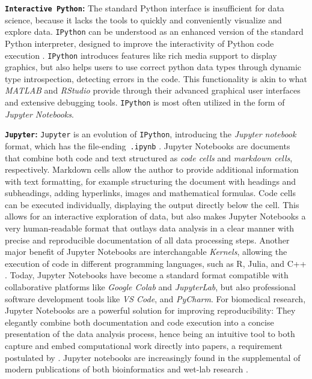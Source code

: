 \textbf{\texttt{\textbf Interactive Python}:} The standard Python interface is
insufficient for data science, because it lacks the tools to quickly and
conveniently visualize and explore data. \texttt{IPython} can be understood as
an enhanced version of the standard Python interpreter, designed to improve the
interactivity of Python code execution \cite{perezIPythonSystemInteractive2007}.
\texttt{IPython} introduces features like rich media support to display
graphics, but also helps users to use correct python data types through dynamic
type introspection, detecting errors in the code. This functionality is akin to
what \textit{MATLAB} and \textit{RStudio} provide through their advanced
graphical user interfaces and extensive debugging tools. \texttt{IPython} is most
often utilized in the form of \emph{Jupyter Notebooks}.



\textbf{\texttt{Jupyter}:} \texttt{Jupyter} is an evolution of \texttt{IPython},
introducing the \emph{Jupyter notebook} format, which has the
file-ending~\texttt{.ipynb} \cite{kluyverJupyterNotebooksPublishing2016}.
Jupyter Notebooks are documents that combine both code and text structured as
\emph{code cells} and \emph{markdown cells}, respectively. Markdown cells allow
the author to provide additional information with text formatting, for example
structuring the document with headings and subheadings, adding hyperlinks,
images and mathematical formulas. Code cells can be executed individually,
displaying the output directly below the cell. This allows for an interactive
exploration of data, but also makes Jupyter Notebooks a very human-readable
format that outlays data analysis in a clear manner with precise and
reproducible documentation of all data processing steps. Another major benefit
of Jupyter Notebooks are interchangable \textit{Kernels}, allowing the execution
of code in different programming languages, such as R, Julia, and C++
\cite{giorgiLanguageEngineBioinformatics2022}. Today, Jupyter Notebooks have
become a standard format compatible with collaborative platforms like
\textit{Google Colab} and \textit{JupyterLab}, but also professional software
development tools like \textit{VS Code}, and \textit{PyCharm}. For biomedical
research, Jupyter Notebooks are a powerful solution for improving
reproducibility: They elegantly combine both documentation and code execution
into a concise presentation of the data analysis process, hence being an
intuitive tool to both capture and embed computational work directly into
papers, a requirement postulated by
\citet{mesirovAccessibleReproducibleResearch2010}. Jupyter notebooks are
increasingly found in the supplemental of modern publications of both
bioinformatics and wet-lab research
\cite{taskiranCelltypedirectedDesignSynthetic2024,
    bosch-queraltFluorescenceMicroscopybasedProtocol2022,
    howeChallengesOpportunitiesUnderstanding2015}.



